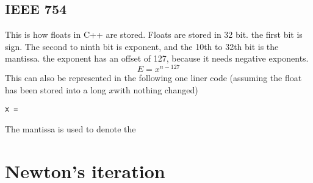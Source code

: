 \documentclass{article} %
\begin{document}
\subsection{IEEE 754}
    This is how floats in C++ are stored. Floats are stored in 32 bit. the first bit is sign.
    The second to ninth bit is exponent, and the 10th to 32th bit is the mantissa. the exponent has
    an offset of 127, because it needs negative exponents.
    \begin{equation}
        E = x^{n-127}
    \end{equation}
    This can also be represented in the following one liner code (assuming the float has been stored into a long $x$with nothing changed)
    \begin{verbatim}
x = 
    \end{verbatim}
    The mantissa is used to denote the 


\section{Newton's iteration}
\end{document}
